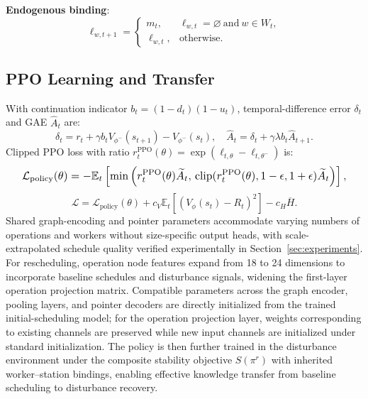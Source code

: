 \documentclass[journal,10pt]{IEEEtran}
\begin{document}
\textbf{Endogenous binding}:
\begin{equation}
\ell_{w,t+1} = \begin{cases} m_t, & \ell_{w,t}=\varnothing \ \text{and}\ w\in W_t, \\ \ell_{w,t}, & \text{otherwise}. \end{cases}
\end{equation}

\subsection{PPO Learning and Transfer}

With continuation indicator $b_t=(1-d_t)(1-u_t)$, temporal-difference error $\delta_t$ and GAE $\widehat A_t$ are:
\begin{equation}
\delta_t = r_t + \gamma b_t V_{\phi^-}(s_{t+1}) - V_{\phi^-}(s_t), \quad \widehat A_t = \delta_t + \gamma\lambda b_t \widehat A_{t+1}.
\end{equation}
Clipped PPO loss with ratio $r_t^{\mathrm{PPO}}(\theta)=\exp(\ell_{t,\theta}-\ell_{t,\theta^-})$ is:
\begin{equation}
\resizebox{0.95\linewidth}{!}{$\displaystyle
\mathcal L_{\mathrm{policy}}(\theta) = -\mathbb E_t\left[\min\left(r_t^{\mathrm{PPO}}(\theta)\widetilde A_t,\, \operatorname{clip}(r_t^{\mathrm{PPO}}(\theta), 1-\epsilon, 1+\epsilon)\widetilde A_t\right)\right],
$}
\end{equation}
\begin{equation}
\mathcal L = \mathcal L_{\mathrm{policy}}(\theta) + c_V \mathbb E_t[(V_\phi(s_t)-R_t)^2] - c_H \overline H.
\end{equation}
Shared graph-encoding and pointer parameters accommodate varying numbers of operations and workers without size-specific output heads, with scale-extrapolated schedule quality verified experimentally in Section~\ref{sec:experiments}. For rescheduling, operation node features expand from 18 to 24 dimensions to incorporate baseline schedules and disturbance signals, widening the first-layer operation projection matrix. Compatible parameters across the graph encoder, pooling layers, and pointer decoders are directly initialized from the trained initial-scheduling model; for the operation projection layer, weights corresponding to existing channels are preserved while new input channels are initialized under standard initialization. The policy is then further trained in the disturbance environment under the composite stability objective $S(\pi^r)$ with inherited worker--station bindings, enabling effective knowledge transfer from baseline scheduling to disturbance recovery.
\end{document}

